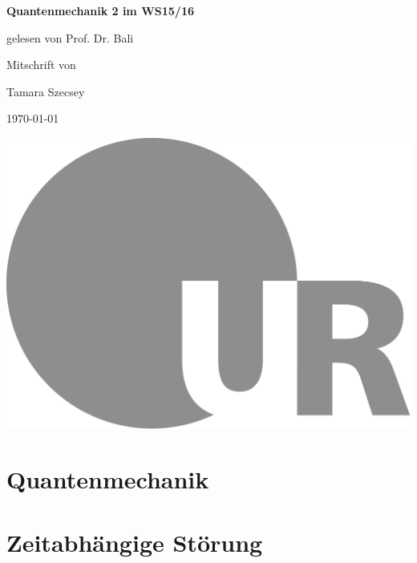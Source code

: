 \documentclass[ngerman, paper=a4, 12pt]{scrartcl}
\begin{document}
	\begin{titlepage}
		\begin{minipage}[c]{\textwidth}
			\begin{center}
				{ \Huge \textbf{Quantenmechanik 2 im WS15/16} }
				
				\vspace{1cm}
				{\Large{gelesen von Prof. Dr. Bali}}
				
				\vspace*{1cm}
				{\large Mitschrift von }
				
				\vspace*{0.2cm}
				{\Large Tamara Szecsey}
				
				\vspace*{1cm}
				{\large \today}
				
				\vspace*{3cm}
				\hspace*{1cm} \includegraphics[height=35ex]{LOGO_UR}
			\end{center}
		\end{minipage}
	\end{titlepage}
\tableofcontents
\newpage
\setcounter{section}{-1}
	
	\section{Quantenmechanik}
	
	
	
	
	\section{Zeitabhängige Störung}
	
	
	
	
	
	
	
\end{document}
